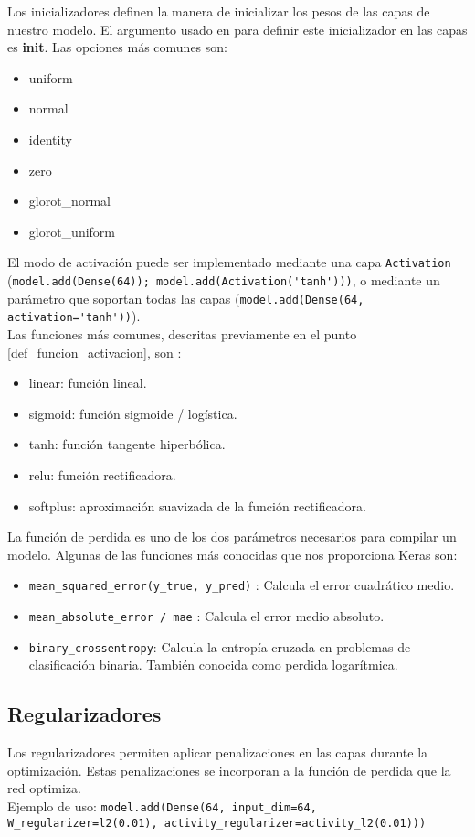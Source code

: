 Los inicializadores definen la manera de inicializar los pesos de las capas de nuestro modelo. El argumento usado en para definir este inicializador en las capas es \textbf{init}. Las opciones más comunes son:
\begin{itemize}[noitemsep]
\item uniform
\item normal
\item identity
\item zero
\item glorot\_normal
\item glorot\_uniform
\end{itemize}

El modo de activación puede ser implementado mediante una capa \lstinline{Activation} (\lstinline{model.add(Dense(64)); model.add(Activation('tanh')))}, o mediante un parámetro que soportan todas las capas (\lstinline{model.add(Dense(64, activation='tanh'))}).\\
Las funciones más comunes, descritas previamente en el punto \ref{def_funcion_activacion}, son :
\begin{itemize}[noitemsep]
\item linear: función lineal.
\item sigmoid: función sigmoide / logística.
\item tanh: función tangente hiperbólica.
\item relu: función rectificadora.
\item softplus: aproximación suavizada de la función rectificadora.
\end{itemize}
La función de perdida es uno de los dos parámetros necesarios para compilar un modelo. Algunas de las funciones más conocidas que nos proporciona Keras son:
\begin{itemize}[noitemsep]
\item \lstinline{mean_squared_error(y_true, y_pred)} : Calcula el error cuadrático medio.
\item \lstinline{mean_absolute_error / mae} : Calcula el error medio absoluto.
\item \lstinline{binary_crossentropy}: Calcula la entropía cruzada en problemas de clasificación binaria. También conocida como perdida logarítmica.
\end{itemize}
\subsection{Regularizadores}
Los regularizadores permiten aplicar penalizaciones en las capas durante la optimización. Estas penalizaciones se incorporan a la función de perdida que la red optimiza.\\
Ejemplo de uso:
\lstinline{model.add(Dense(64, input_dim=64, W_regularizer=l2(0.01), activity_regularizer=activity_l2(0.01)))}

